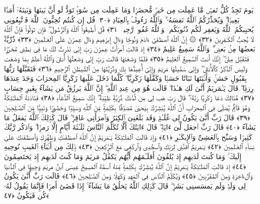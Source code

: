  يَومَ تَجِدُ كُلُّ نَفسٍۢ مَّا عَمِلَت مِن خَيرٍۢ مُّحضَرًۭا وَمَا عَمِلَت مِن سُوٓءٍۢ تَوَدُّ لَو أَنَّ بَينَهَا وَبَينَهُۥٓ أَمَدًۢا بَعِيدًۭا ۗ وَيُحَذِّرُكُمُ ٱللَّهُ نَفسَهُۥ ۗ وَٱللَّهُ رَءُوفٌۢ بِٱلعِبَادِ ﴿٣٠﴾
 قُل إِن كُنتُم تُحِبُّونَ ٱللَّهَ فَٱتَّبِعُونِى يُحبِبكُمُ ٱللَّهُ وَيَغفِر لَكُم ذُنُوبَكُم ۗ وَٱللَّهُ غَفُورٌۭ رَّحِيمٌۭ ﴿٣١﴾
 قُل أَطِيعُوا۟ ٱللَّهَ وَٱلرَّسُولَ ۖ فَإِن تَوَلَّوا۟ فَإِنَّ ٱللَّهَ لَا يُحِبُّ ٱلكَـٰفِرِينَ ﴿٣٢﴾
 ۞ إِنَّ ٱللَّهَ ٱصطَفَىٰٓ ءَادَمَ وَنُوحًۭا وَءَالَ إِبرَٰهِيمَ وَءَالَ عِمرَٰنَ عَلَى ٱلعَـٰلَمِينَ ﴿٣٣﴾
 ذُرِّيَّةًۢ بَعضُهَا مِنۢ بَعضٍۢ ۗ وَٱللَّهُ سَمِيعٌ عَلِيمٌ ﴿٣٤﴾
 إِذ قَالَتِ ٱمرَأَتُ عِمرَٰنَ رَبِّ إِنِّى نَذَرتُ لَكَ مَا فِى بَطنِى مُحَرَّرًۭا فَتَقَبَّل مِنِّىٓ ۖ إِنَّكَ أَنتَ ٱلسَّمِيعُ ٱلعَلِيمُ ﴿٣٥﴾
 فَلَمَّا وَضَعَتهَا قَالَت رَبِّ إِنِّى وَضَعتُهَآ أُنثَىٰ وَٱللَّهُ أَعلَمُ بِمَا وَضَعَت وَلَيسَ ٱلذَّكَرُ كَٱلأُنثَىٰ ۖ وَإِنِّى سَمَّيتُهَا مَريَمَ وَإِنِّىٓ أُعِيذُهَا بِكَ وَذُرِّيَّتَهَا مِنَ ٱلشَّيطَٰنِ ٱلرَّجِيمِ ﴿٣٦﴾
 فَتَقَبَّلَهَا رَبُّهَا بِقَبُولٍ حَسَنٍۢ وَأَنۢبَتَهَا نَبَاتًا حَسَنًۭا وَكَفَّلَهَا زَكَرِيَّا ۖ كُلَّمَا دَخَلَ عَلَيهَا زَكَرِيَّا ٱلمِحرَابَ وَجَدَ عِندَهَا رِزقًۭا ۖ قَالَ يَـٰمَريَمُ أَنَّىٰ لَكِ هَـٰذَا ۖ قَالَت هُوَ مِن عِندِ ٱللَّهِ ۖ إِنَّ ٱللَّهَ يَرزُقُ مَن يَشَآءُ بِغَيرِ حِسَابٍ ﴿٣٧﴾
 هُنَالِكَ دَعَا زَكَرِيَّا رَبَّهُۥ ۖ قَالَ رَبِّ هَب لِى مِن لَّدُنكَ ذُرِّيَّةًۭ طَيِّبَةً ۖ إِنَّكَ سَمِيعُ ٱلدُّعَآءِ ﴿٣٨﴾
 فَنَادَتهُ ٱلمَلَـٰٓئِكَةُ وَهُوَ قَآئِمٌۭ يُصَلِّى فِى ٱلمِحرَابِ أَنَّ ٱللَّهَ يُبَشِّرُكَ بِيَحيَىٰ مُصَدِّقًۢا بِكَلِمَةٍۢ مِّنَ ٱللَّهِ وَسَيِّدًۭا وَحَصُورًۭا وَنَبِيًّۭا مِّنَ ٱلصَّـٰلِحِينَ ﴿٣٩﴾
 قَالَ رَبِّ أَنَّىٰ يَكُونُ لِى غُلَـٰمٌۭ وَقَد بَلَغَنِىَ ٱلكِبَرُ وَٱمرَأَتِى عَاقِرٌۭ ۖ قَالَ كَذَٟلِكَ ٱللَّهُ يَفعَلُ مَا يَشَآءُ ﴿٤٠﴾
 قَالَ رَبِّ ٱجعَل لِّىٓ ءَايَةًۭ ۖ قَالَ ءَايَتُكَ أَلَّا تُكَلِّمَ ٱلنَّاسَ ثَلَـٰثَةَ أَيَّامٍ إِلَّا رَمزًۭا ۗ وَٱذكُر رَّبَّكَ كَثِيرًۭا وَسَبِّح بِٱلعَشِىِّ وَٱلإِبكَـٰرِ ﴿٤١﴾
 وَإِذ قَالَتِ ٱلمَلَـٰٓئِكَةُ يَـٰمَريَمُ إِنَّ ٱللَّهَ ٱصطَفَىٰكِ وَطَهَّرَكِ وَٱصطَفَىٰكِ عَلَىٰ نِسَآءِ ٱلعَـٰلَمِينَ ﴿٤٢﴾
 يَـٰمَريَمُ ٱقنُتِى لِرَبِّكِ وَٱسجُدِى وَٱركَعِى مَعَ ٱلرَّٟكِعِينَ ﴿٤٣﴾
 ذَٟلِكَ مِن أَنۢبَآءِ ٱلغَيبِ نُوحِيهِ إِلَيكَ ۚ وَمَا كُنتَ لَدَيهِم إِذ يُلقُونَ أَقلَـٰمَهُم أَيُّهُم يَكفُلُ مَريَمَ وَمَا كُنتَ لَدَيهِم إِذ يَختَصِمُونَ ﴿٤٤﴾
 إِذ قَالَتِ ٱلمَلَـٰٓئِكَةُ يَـٰمَريَمُ إِنَّ ٱللَّهَ يُبَشِّرُكِ بِكَلِمَةٍۢ مِّنهُ ٱسمُهُ ٱلمَسِيحُ عِيسَى ٱبنُ مَريَمَ وَجِيهًۭا فِى ٱلدُّنيَا وَٱلءَاخِرَةِ وَمِنَ ٱلمُقَرَّبِينَ ﴿٤٥﴾
 وَيُكَلِّمُ ٱلنَّاسَ فِى ٱلمَهدِ وَكَهلًۭا وَمِنَ ٱلصَّـٰلِحِينَ ﴿٤٦﴾
 قَالَت رَبِّ أَنَّىٰ يَكُونُ لِى وَلَدٌۭ وَلَم يَمسَسنِى بَشَرٌۭ ۖ قَالَ كَذَٟلِكِ ٱللَّهُ يَخلُقُ مَا يَشَآءُ ۚ إِذَا قَضَىٰٓ أَمرًۭا فَإِنَّمَا يَقُولُ لَهُۥ كُن فَيَكُونُ ﴿٤٧﴾
